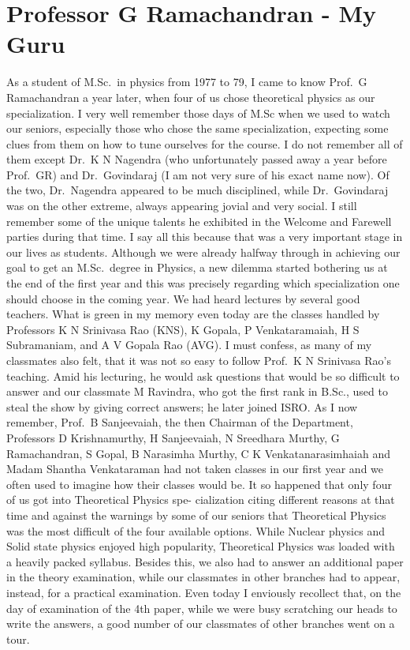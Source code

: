 \chapter[Professor G Ramachandran - My Guru]{Professor G Ramachandran - My Guru}\label{chap26}


\noindent
As a student of M.Sc.\ in physics from 1977 to 79, I came to know Prof.\ G Ramachandran a year later, when four of us chose theoretical physics as our specialization. I very well remember those days of M.Sc when we used to watch our seniors, especially those who chose the same specialization, expecting some clues from them on how to tune ourselves for the course. I do not remember all of them except Dr.\ K N Nagendra (who unfortunately passed away a year before Prof.\ GR) and Dr.\ Govindaraj (I am not very sure of his exact name now). Of the two, Dr.\ Nagendra appeared to be much disciplined, while Dr.\ Govindaraj was on the other extreme, always appearing jovial and very social. I still remember some of the unique talents he exhibited in the Welcome and Farewell parties during that time. I say all this because that was a very important stage in our lives as students. Although we were already halfway through in achieving our goal to get an M.Sc.\ degree in Physics, a new dilemma started bothering us at the end of the first year and this was precisely regarding which specialization one should choose in the coming year. We had heard lectures by several good teachers. What is green in my memory even today are the classes handled by Professors K N Srinivasa Rao (KNS), K Gopala, P Venkataramaiah, H S Subramaniam, and A V Gopala Rao (AVG). I must confess, as many of my classmates also felt, that it was not so easy to follow Prof.\ K N Srinivasa Rao's teaching. Amid his lecturing, he would ask questions that would be so difficult to answer and our classmate M Ravindra, who got the first rank in B.Sc., used to steal the show by giving correct answers; he later joined ISRO. As I now remember, Prof.\ B Sanjeevaiah, the then Chairman of the Department, Professors D Krishnamurthy, H Sanjeevaiah, N Sreedhara Murthy, G Ramachandran, S Gopal, B Narasimha Murthy, C K Venkatanarasimhaiah and Madam Shantha Venkataraman had not taken classes in our first year and we often used to imagine how their classes would be. It so happened that only four of us got into Theoretical Physics spe- cialization citing different reasons at that time and against the warnings by some of our seniors that Theoretical Physics was the most difficult of the four available options. While Nuclear physics and Solid state physics enjoyed high popularity, Theoretical Physics was loaded with a heavily packed syllabus. Besides this, we also had to answer an additional paper in the theory examination, while our classmates in other branches had to appear, instead, for a practical examination. Even today I enviously recollect that, on the day of examination of the 4th paper, while we were busy scratching our heads to write the answers, a good number of our classmates of other branches went on a tour.

